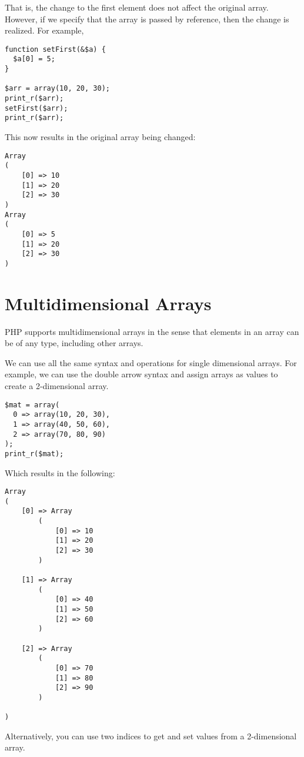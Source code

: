 That is, the change to the first element does not affect the
original array.  However, if we specify that the array is passed
by reference, then the change is realized.  For example, 

\begin{verbatim}
function setFirst(&$a) {
  $a[0] = 5;
}

$arr = array(10, 20, 30);
print_r($arr);
setFirst($arr);
print_r($arr);
\end{verbatim}

This now results in the original array being changed:

\begin{verbatim}
Array
(
    [0] => 10
    [1] => 20
    [2] => 30
)
Array
(
    [0] => 5
    [1] => 20
    [2] => 30
)
\end{verbatim}

\section{Multidimensional Arrays}

PHP supports multidimensional arrays in the sense that
elements in an array can be of any type, including other 
arrays.

We can use all the same syntax and operations for single
dimensional arrays.  For example, we can use the double
arrow syntax and assign arrays as values to create a 2-dimensional
array.

\begin{verbatim}
$mat = array(
  0 => array(10, 20, 30),
  1 => array(40, 50, 60),
  2 => array(70, 80, 90)
);
print_r($mat);
\end{verbatim}

Which results in the following:

\begin{verbatim}
Array
(
    [0] => Array
        (
            [0] => 10
            [1] => 20
            [2] => 30
        )

    [1] => Array
        (
            [0] => 40
            [1] => 50
            [2] => 60
        )

    [2] => Array
        (
            [0] => 70
            [1] => 80
            [2] => 90
        )

)
\end{verbatim}

Alternatively, you can use two indices to get and set values 
from a 2-dimensional array.

